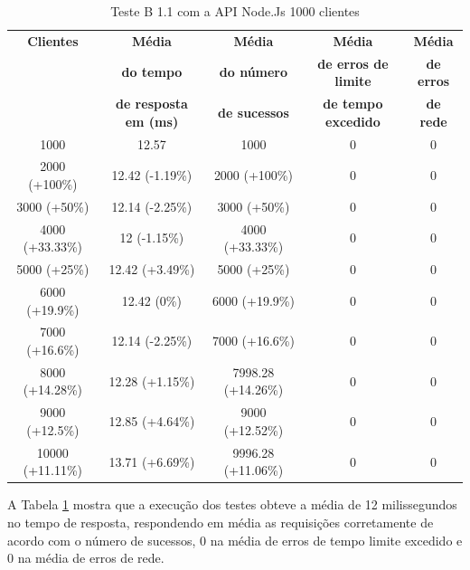   \begin{table}[H]
    \centering
    \footnotesize
    \setlength{\abovecaptionskip}{0pt}
    \setlength{\belowcaptionskip}{0pt}
    \caption[Teste B-1.1 com a API 1000 clientes]{Teste B 1.1 com a API Node.Js 1000 clientes}
    \label{tab:teste-b-1-1}
    \begin{tabular}{c|c|c|c|c}
      \hline \hline
      \textbf{Clientes} & \textbf{Média} &	\textbf{Média} & \textbf{Média} & \textbf{Média}  \\
      		& \textbf{do tempo} &   \textbf{do número } & \textbf{de erros de limite} & \textbf{de erros}  \\
      		& \textbf{de resposta em (ms) } &\textbf{de sucessos } & \textbf{de tempo excedido} & \textbf{de rede} \\
      \hline \hline
      1000 &			12.57 & 		1000	 & 		0 &	0 \\
      2000 (+100\%)&		12.42 (-1.19\%) & 	2000 (+100\%) & 	0 &	0 \\
      3000 (+50\%)&		12.14 (-2.25\%) & 	3000 (+50\%) &	 	0 &	0 \\
      4000 (+33.33\%)&		12 (-1.15\%) & 		4000 (+33.33\%) & 	0 &	0 \\
      5000 (+25\%)&		12.42 (+3.49\%) & 	5000 (+25\%) & 		0 &	0 \\
      6000 (+19.9\%)&		12.42 (0\%) & 		6000 (+19.9\%) & 	0 &	0 \\
      7000 (+16.6\%)&		12.14 (-2.25\%) & 	7000 (+16.6\%) & 	0 &	0 \\
      8000 (+14.28\%)&		12.28 (+1.15\%) & 	7998.28 (+14.26\%) & 	0 &	0 \\
      9000 (+12.5\%)&		12.85 (+4.64\%) & 	9000 (+12.52\%) & 	0 &	0 \\
      10000 (+11.11\%)&		13.71 (+6.69\%) & 	9996.28 (+11.06\%)& 	0 &	0 \\
      \hline \hline
    \end{tabular}
  \end{table}


  A Tabela \ref{tab:teste-b-1-1} mostra que a execução dos testes obteve a média de 12 milissegundos no tempo de resposta,
  respondendo em média as requisições corretamente de acordo com o número de sucessos, 0 na média de erros de tempo limite excedido
  e 0 na média de erros de rede.

